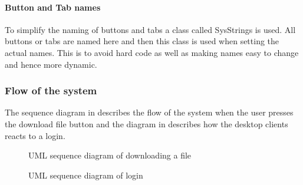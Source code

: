 \paragraph{Button and Tab names}
\label{Button and Tab names}
To simplify the naming of buttons and tabs a class called SysStrings is used. All buttons or tabs are named here and then this class is used when setting the actual names. This is to avoid hard code as well as making names easy to change and hence more dynamic.

\subsubsection{Flow of the system}

The sequence diagram in  describes the flow of the system when the user presses the download file button and the diagram in  describes how the desktop clients reacts to a login.

\begin{figure}[htb!]
	\caption{UML sequence diagram of downloading a file}
	\label{fig:des_download-sequence}
\end{figure}

\begin{figure}[htb!]
	\caption{UML sequence diagram of login}
	\label{fig:des_login-sequence}
\end{figure}
\FloatBarrier